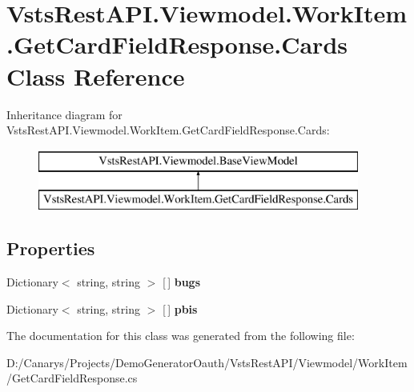 \hypertarget{class_vsts_rest_a_p_i_1_1_viewmodel_1_1_work_item_1_1_get_card_field_response_1_1_cards}{}\section{Vsts\+Rest\+A\+P\+I.\+Viewmodel.\+Work\+Item.\+Get\+Card\+Field\+Response.\+Cards Class Reference}
\label{class_vsts_rest_a_p_i_1_1_viewmodel_1_1_work_item_1_1_get_card_field_response_1_1_cards}
Inheritance diagram for Vsts\+Rest\+A\+P\+I.\+Viewmodel.\+Work\+Item.\+Get\+Card\+Field\+Response.\+Cards\+:\begin{figure}[H]
\begin{center}
\leavevmode
\includegraphics[height=2.000000cm]{class_vsts_rest_a_p_i_1_1_viewmodel_1_1_work_item_1_1_get_card_field_response_1_1_cards}
\end{center}
\end{figure}
\subsection*{Properties}
\begin{DoxyCompactItemize}
\item 
\mbox{\label{class_vsts_rest_a_p_i_1_1_viewmodel_1_1_work_item_1_1_get_card_field_response_1_1_cards_afc24699866a9541f3317538b12bc4ccc}} 
Dictionary$<$ string, string $>$ \mbox{[}$\,$\mbox{]} {\bfseries bugs}
\item 
\mbox{\label{class_vsts_rest_a_p_i_1_1_viewmodel_1_1_work_item_1_1_get_card_field_response_1_1_cards_ae0829a5e583c4c779d26bfaa846df14c}} 
Dictionary$<$ string, string $>$ \mbox{[}$\,$\mbox{]} {\bfseries pbis}
\end{DoxyCompactItemize}


The documentation for this class was generated from the following file\+:\begin{DoxyCompactItemize}
\item 
D\+:/\+Canarys/\+Projects/\+Demo\+Generator\+Oauth/\+Vsts\+Rest\+A\+P\+I/\+Viewmodel/\+Work\+Item/Get\+Card\+Field\+Response.\+cs\end{DoxyCompactItemize}
